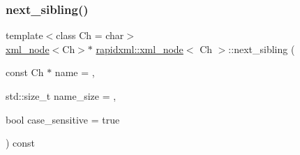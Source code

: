 \subsubsection{\texorpdfstring{next\_sibling()}{next\_sibling()}}
{\footnotesize\ttfamily template$<$class Ch = char$>$ \\
\mbox{\hyperlink{classrapidxml_1_1xml__node}{xml\+\_\+node}}$<$Ch$>$$\ast$ \mbox{\hyperlink{classrapidxml_1_1xml__node}{rapidxml\+::xml\+\_\+node}}$<$ Ch $>$\+::next\+\_\+sibling (\begin{DoxyParamCaption}\item[{const Ch $\ast$}]{name = {},  }\item[{std\+::size\+\_\+t}]{name\+\_\+size = {},  }\item[{bool}]{case\+\_\+sensitive = {\ttfamily true} }\end{DoxyParamCaption}) const\hspace{0.3cm}{\ttfamily [inline]}}

